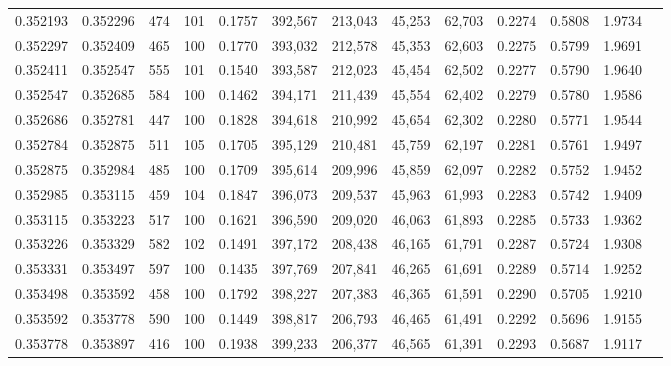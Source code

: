 \begin{tabular}{rrrrrrrrrrrrr}
0.352193 & 0.352296 &   474 & 101 &                                     0.1757 & 392,567 & 213,043 &  45,253 &  62,703 & 0.2274 & 0.5808 & 1.9734 \\
0.352297 & 0.352409 &   465 & 100 &                                     0.1770 & 393,032 & 212,578 &  45,353 &  62,603 & 0.2275 & 0.5799 & 1.9691 \\
0.352411 & 0.352547 &   555 & 101 &                                     0.1540 & 393,587 & 212,023 &  45,454 &  62,502 & 0.2277 & 0.5790 & 1.9640 \\
0.352547 & 0.352685 &   584 & 100 &                                     0.1462 & 394,171 & 211,439 &  45,554 &  62,402 & 0.2279 & 0.5780 & 1.9586 \\
0.352686 & 0.352781 &   447 & 100 &                                     0.1828 & 394,618 & 210,992 &  45,654 &  62,302 & 0.2280 & 0.5771 & 1.9544 \\
0.352784 & 0.352875 &   511 & 105 &                                     0.1705 & 395,129 & 210,481 &  45,759 &  62,197 & 0.2281 & 0.5761 & 1.9497 \\
0.352875 & 0.352984 &   485 & 100 &                                     0.1709 & 395,614 & 209,996 &  45,859 &  62,097 & 0.2282 & 0.5752 & 1.9452 \\
0.352985 & 0.353115 &   459 & 104 &                                     0.1847 & 396,073 & 209,537 &  45,963 &  61,993 & 0.2283 & 0.5742 & 1.9409 \\
0.353115 & 0.353223 &   517 & 100 &                                     0.1621 & 396,590 & 209,020 &  46,063 &  61,893 & 0.2285 & 0.5733 & 1.9362 \\
0.353226 & 0.353329 &   582 & 102 &                                     0.1491 & 397,172 & 208,438 &  46,165 &  61,791 & 0.2287 & 0.5724 & 1.9308 \\
0.353331 & 0.353497 &   597 & 100 &                                     0.1435 & 397,769 & 207,841 &  46,265 &  61,691 & 0.2289 & 0.5714 & 1.9252 \\
0.353498 & 0.353592 &   458 & 100 &                                     0.1792 & 398,227 & 207,383 &  46,365 &  61,591 & 0.2290 & 0.5705 & 1.9210 \\
0.353592 & 0.353778 &   590 & 100 &                                     0.1449 & 398,817 & 206,793 &  46,465 &  61,491 & 0.2292 & 0.5696 & 1.9155 \\
0.353778 & 0.353897 &   416 & 100 &                                     0.1938 & 399,233 & 206,377 &  46,565 &  61,391 & 0.2293 & 0.5687 & 1.9117 \\

\end{tabular}

